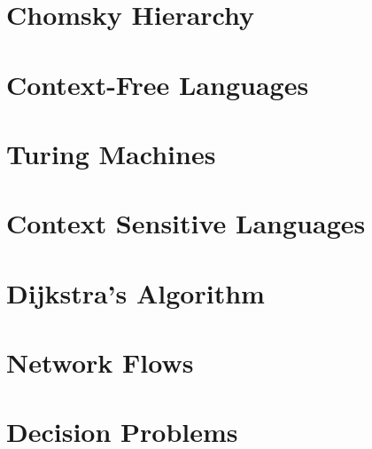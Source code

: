 \documentclass[landscape,twocolumn,a4paper]{article}
\begin{document}
\section{Chomsky Hierarchy}

\section{Context-Free Languages}

\section{Turing Machines}

\section{Context Sensitive Languages}


\section{Dijkstra's Algorithm}

\section{Network Flows}

\section{Decision Problems}


\end{document}
